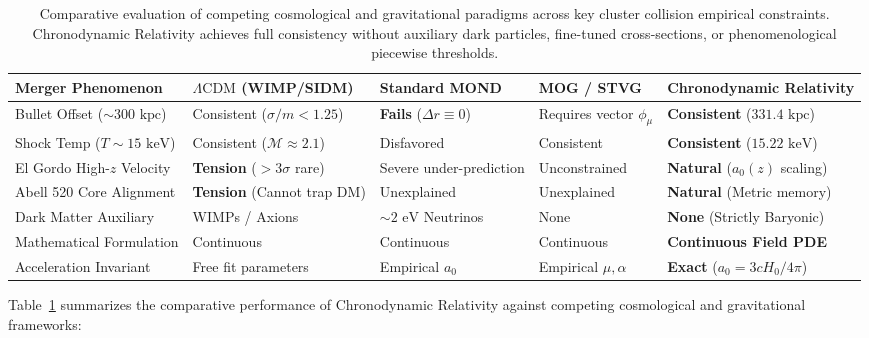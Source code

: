 \documentclass[aps,prd,reprint,superscriptaddress,nofootinbib,floatfix,amsmath,amssymb]{revtex4-2}
\begin{document}
\begin{table}[t]
\caption{Comparative evaluation of competing cosmological and gravitational paradigms across key cluster collision empirical constraints. Chronodynamic Relativity achieves full consistency without auxiliary dark particles, fine-tuned cross-sections, or phenomenological piecewise thresholds.}
\label{tab:comparison}
\begin{ruledtabular}
\footnotesize
\setlength{\tabcolsep}{3pt}
\begin{tabular}{lllll}
Merger Phenomenon & $\Lambda\text{CDM}$ (WIMP/SIDM) & Standard MOND & MOG / STVG & Chronodynamic Relativity \\
\hline
Bullet Offset ($\sim 300\text{ kpc}$) & Consistent ($\sigma/m < 1.25$) & \textbf{Fails} ($\Delta r \equiv 0$) & Requires vector $\phi_\mu$ & \textbf{Consistent} ($331.4\text{ kpc}$) \\
Shock Temp ($T \sim 15\text{ keV}$) & Consistent ($\mathcal{M} \approx 2.1$) & Disfavored & Consistent & \textbf{Consistent} ($15.22\text{ keV}$) \\
El Gordo High-$z$ Velocity & \textbf{Tension} ($> 3\sigma$ rare) & Severe under-prediction & Unconstrained & \textbf{Natural} ($a_0(z)$ scaling) \\
Abell 520 Core Alignment & \textbf{Tension} (Cannot trap DM) & Unexplained & Unexplained & \textbf{Natural} (Metric memory) \\
Dark Matter Auxiliary & WIMPs / Axions & $\sim 2\text{ eV}$ Neutrinos & None & \textbf{None} (Strictly Baryonic) \\
Mathematical Formulation & Continuous & Continuous & Continuous & \textbf{Continuous Field PDE} \\
Acceleration Invariant & Free fit parameters & Empirical $a_0$ & Empirical $\mu, \alpha$ & \textbf{Exact} ($a_0 = 3 c H_0 / 4\pi$) \\
\end{tabular}
\end{ruledtabular}
\end{table}

Table~\ref{tab:comparison} summarizes the comparative performance of Chronodynamic Relativity against competing cosmological and gravitational frameworks:
\end{document}
